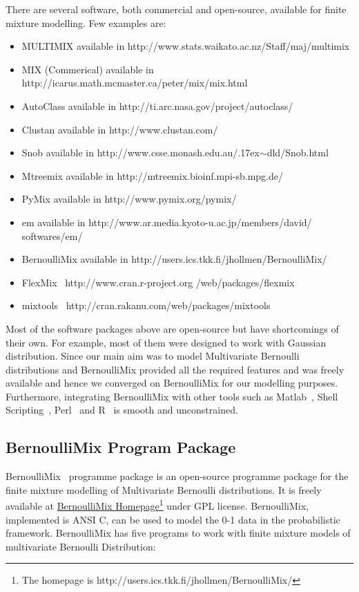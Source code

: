 There are several software, both commercial and open-source, available for finite mixture modelling. Few examples are:
\begin{itemize}
 \item MULTIMIX available in http:\slash\slash www.stats.waikato.ac.nz\slash Staff\slash maj\slash multimix%
 \item MIX (Commerical) available in http:\slash\slash icarus.math.mcmaster.ca\slash peter\slash mix\slash mix.html
 \item AutoClass available in http:\slash\slash ti.arc.nasa.gov\slash project\slash autoclass\slash 
 \item Clustan available in http:\slash\slash www.clustan.com\slash 
 \item Snob available in http:\slash\slash www.csse.monash.edu.au\slash {\raise.17ex\hbox{$\scriptstyle\mathtt{\sim}$}}dld\slash Snob.html
 \item Mtreemix available in http:\slash\slash mtreemix.bioinf.mpi-sb.mpg.de\slash 
 \item PyMix available in http:\slash\slash www.pymix.org/pymix\slash 
 \item em available in http:\slash\slash www.ar.media.kyoto-u.ac.jp\slash members\slash david\slash \\ softwares\slash em\slash 
 \item BernoulliMix available in http:\slash\slash users.ics.tkk.fi\slash jhollmen\slash BernoulliMix\slash  
 \item FlexMix~\cite{flexmix} http:\slash\slash www.cran.r-project.org \slash web\slash packages\slash flexmix
 \item mixtools~\cite{mixtools} http:\slash\slash cran.rakanu.com\slash web\slash packages\slash mixtools
\end{itemize}


Most of the software packages above are open-source but have shortcomings of their own. For example, most of them were designed to work with Gaussian distribution. Since our main aim was to model Multivariate Bernoulli distributions and BernoulliMix provided all the required features and was freely available and hence we converged  on BernoulliMix for our modelling purposes. Furthermore, integrating BernoulliMix with other tools such as Matlab~\cite{matlab}, Shell Scripting~\cite{shellscript}, Perl~\cite{perl} and R~\cite{rlang} is smooth and unconstrained. 

\subsection{BernoulliMix Program Package}
\label{ss:bmix}
BernoulliMix~\cite{bmixdoc} programme package is an open-source programme package for the finite mixture modelling of Multivariate Bernoulli distributions. It is freely available at \href{http://www.cis.hut.fi/jhollmen/BernoulliMix/}{BernoulliMix Homepage}\footnote{The homepage is http://users.ics.tkk.fi/jhollmen/BernoulliMix/} under GPL license. BernoulliMix, implemented is ANSI C, can be used to model the \mbox{0-1} data in the probabilistic framework. BernoulliMix has five programs to work with finite mixture models of multivariate Bernoulli Distribution:

